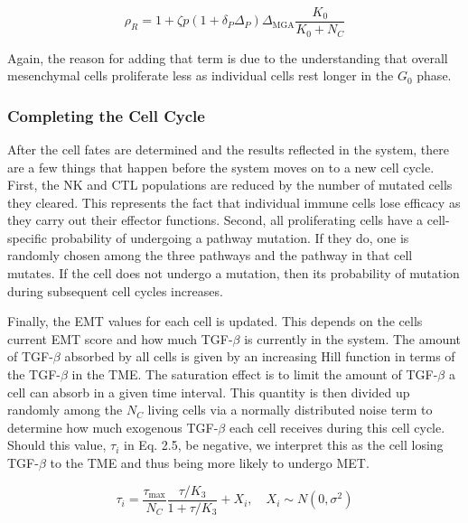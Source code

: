\documentclass[11pt]{article}
\begin{document}
\begin{equation}\tag{2.4}
\rho_R = 1 + \zeta p(1+\delta_P\Delta_P)\Delta_{\text{MGA}}\frac{K_0}{K_0+N_C}
\end{equation}

Again, the reason for adding that term is due to the understanding that overall mesenchymal cells proliferate less as individual cells rest longer in the $G_0$ phase.

\subsubsection{Completing the Cell Cycle}
After the cell fates are determined and the results reflected in the system, there are a few things that happen before the system moves on to a new cell cycle.
First, the NK and CTL populations are reduced by the number of mutated cells they cleared.
This represents the fact that individual immune cells lose efficacy as they carry out their effector functions. 
Second, all proliferating cells have a cell-specific probability of undergoing a pathway mutation.
If they do, one is randomly chosen among the three pathways and the pathway in that cell mutates.
If the cell does not undergo a mutation, then its probability of mutation during subsequent cell cycles increases.
\par
Finally, the EMT values for each cell is updated.
This depends on the cells current EMT score and how much TGF-$\beta$ is currently in the system.
The amount of TGF-$\beta$ absorbed by all cells is given by an increasing Hill function in terms of the TGF-$\beta$ in the TME.
The saturation effect is to limit the amount of TGF-$\beta$ a cell can absorb in a given time interval.
This quantity is then divided up randomly among the $N_C$ living cells via a normally distributed noise term to determine how much exogenous TGF-$\beta$ each cell receives during this cell cycle.
Should this value, $\tau_i$ in Eq. 2.5, be negative, we interpret this as the cell losing TGF-$\beta$ to the TME and thus being more likely to undergo MET.

\begin{equation}\tag{2.5}
\tau_i = \frac{\tau_{\text{max}}}{N_C}\frac{\tau/K_3}{1+\tau/K_3} + X_i
, \quad X_i \sim N(0,\sigma^2)
\end{equation}
\end{document}
